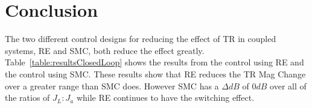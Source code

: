  \section{Conclusion}\label{sec:con}
The two different control designs for reducing the effect of TR in coupled systems, RE and SMC, both
reduce the effect greatly. Table~\ref{table:resultsClosedLoop} shows the results from the control using RE 
and the control using SMC. These results show that RE reduces the TR Mag Change over a
greater range than SMC does. However SMC has a $\Delta dB$ of $0dB$ over all of the ratios of $J_L:J_a$ while RE
continues to have the switching effect.
 
 
 